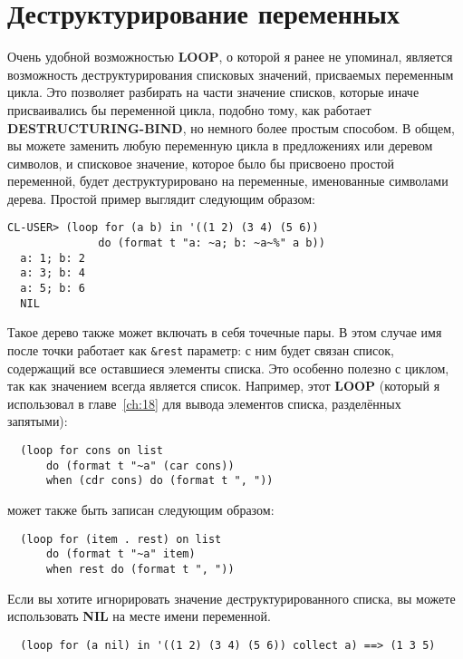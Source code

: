 \section{Деструктурирование переменных}

Очень удобной возможностью \textbf{LOOP}, о которой я ранее не упоминал, является
возможность деструктурирования списковых значений, присваемых переменным цикла. Это
позволяет разбирать на части значение списков, которые иначе присваивались бы переменной
цикла, подобно тому, как работает \textbf{DESTRUCTURING-BIND}, но немного более простым
способом. В общем, вы можете заменить любую переменную цикла в предложениях  или
 деревом символов, и списковое значение, которое было бы присвоено простой
переменной, будет деструктурировано на переменные, именованные символами дерева. Простой
пример выглядит следующим образом:

\begin{lstlisting}[style=lisprepl]
  CL-USER> (loop for (a b) in '((1 2) (3 4) (5 6))
              do (format t "a: ~a; b: ~a~%" a b))
  a: 1; b: 2
  a: 3; b: 4
  a: 5; b: 6
  NIL
\end{lstlisting}

Такое дерево также может включать в себя точечные пары. В этом случае имя после точки
работает как \lstinline!&rest! параметр: с ним будет связан список, содержащий все
оставшиеся элементы списка. Это особенно полезно с  циклом, так как значением
всегда является список. Например, этот \textbf{LOOP} (который я использовал в
главе~\ref{ch:18} для вывода элементов списка, разделённых запятыми):

\begin{lstlisting}
  (loop for cons on list
      do (format t "~a" (car cons))
      when (cdr cons) do (format t ", "))
\end{lstlisting}

может также быть записан следующим образом:

\begin{lstlisting}
  (loop for (item . rest) on list
      do (format t "~a" item)
      when rest do (format t ", "))
\end{lstlisting}

Если вы хотите игнорировать значение деструктурированного списка, вы можете использовать
\textbf{NIL} на месте имени переменной.

\begin{lstlisting}
  (loop for (a nil) in '((1 2) (3 4) (5 6)) collect a) ==> (1 3 5)
\end{lstlisting}

